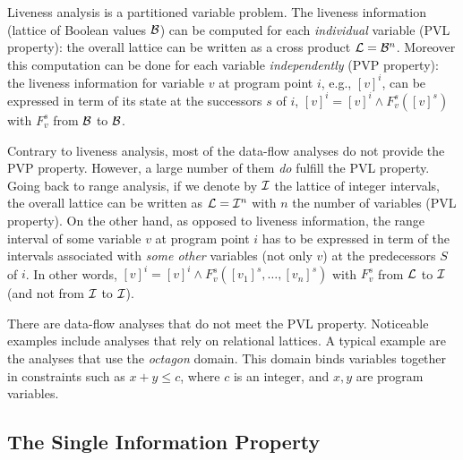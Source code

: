 Liveness analysis is a partitioned variable problem.
The liveness information (lattice of Boolean values ${\cal B}$) can be computed for each \emph{individual} variable (PVL property): the overall lattice can be written as a cross product ${\cal L}={\cal B}^n$. Moreover this computation can be done for each variable \emph{independently} (PVP property): the liveness information for variable $v$ at program point $i$, e.g., $[v]^i$, can be expressed in term of its state at the successors $s$ of $i$,
$[v]^i = [v]^i \wedge F_v^s([v]^s)$ with $F_v^s$ from $\cal B$ to $\cal B$.

Contrary to liveness analysis, most of the data-flow analyses do not provide the PVP property.
However, a large number of them \emph{do} fulfill the PVL property.
Going back to range analysis, if we denote by $\cal I$ the lattice of integer intervals, the overall lattice can be written as ${\cal L}={\cal I}^n$ with $n$ the number of variables (PVL property).
On the other hand, as opposed to liveness information, the range interval of some variable $v$ at program point $i$ has to be expressed in term of the intervals associated with \emph{some other} variables (not only $v$) at the predecessors $S$ of $i$.
In other words,  $[v]^i = [v]^i \wedge  F_v^s([v_1]^s,\dots,[v_n]^s)$ with $F_v^s$ from $\cal L$ to $\cal I$ (and not from $\cal I$ to $\cal I$).

There are data-flow analyses that do not meet the PVL property.
Noticeable examples include analyses that rely on relational lattices.
A typical example are the analyses that use the {\em octagon} domain.
This domain binds variables together in constraints such as $x + y \leq c$, where $c$ is an integer, and $x, y$ are program variables.


\subsection{The Single Information Property}
\label{sec:ssi:pereira:singProp}

